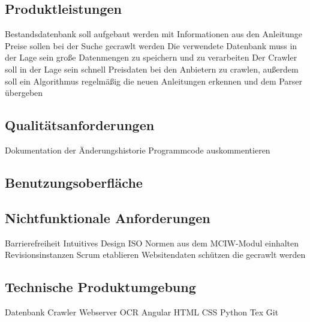 \subsection{Produktleistungen}
Bestandsdatenbank soll aufgebaut werden mit Informationen aus den Anleitunge \newline
Preise sollen bei der Suche gecrawlt werden \newline
Die verwendete Datenbank muss in der Lage sein große Datenmengen zu speichern und zu verarbeiten \newline
Der Crawler soll in der Lage sein schnell Preisdaten bei den Anbietern zu crawlen, außerdem soll ein Algorithmus regelmäßig die neuen Anleitungen erkennen und dem Parser übergeben \newline

\subsection{Qualitätsanforderungen}
Dokumentation der Änderungshistorie \newline
Programmcode auskommentieren \newline

\subsection{Benutzungsoberfläche}


\subsection{Nichtfunktionale Anforderungen}
Barrierefreiheit \newline
Intuitives Design \newline
ISO Normen aus dem MCIW-Modul einhalten \newline
Revisionsinstanzen Scrum etablieren \newline
Websitendaten schützen die gecrawlt werden \newline

\subsection{Technische Produktumgebung}
Datenbank \newline
Crawler \newline
Webserver \newline
OCR \newline
Angular \newline
HTML \newline
CSS \newline
Python \newline
Tex \newline
Git \newline

